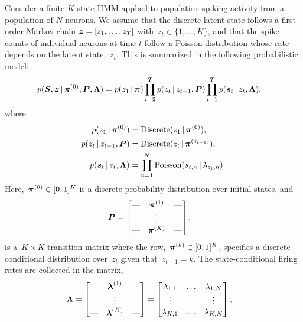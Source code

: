 Consider a finite $K$-state HMM applied to population spiking activity
from a population of $N$ neurons. We assume that the discrete latent
state follows a first-order Markov chain ${\boldsymbol{z} = \left[ z_1, \ldots,
    z_T\right]}$ with~$z_t \in \{1, \ldots, K\}$, and that the
spike counts of individual neurons at time $t$ follow a Poisson
distribution whose rate depends on the latent state,~$z_t$. This is
summarized in the following probabilistic model:
\begin{align}
  p(\boldsymbol{S}, \boldsymbol{z} \,|\, \boldsymbol{\pi}^{(0)}, \boldsymbol{P}, \boldsymbol{\Lambda}) 
  &= p(z_1\,|\, \boldsymbol{\pi}) \prod_{t=2}^T p(z_t \,|\, z_{t-1}, \boldsymbol{P}) 
  \prod_{t=1}^T p(\boldsymbol{s}_t \,|\, z_t, \boldsymbol{\Lambda}),
\end{align}
where
\begin{align*}
  p(z_1 \,|\, \boldsymbol{\pi}^{(0)}) &= \mathrm{Discrete}(z_1 \,|\, \boldsymbol{\pi}^{(0)}), \\
  p(z_t \,|\, z_{t-1}, \boldsymbol{P}) &= \mathrm{Discrete}(z_t \,|\, \boldsymbol{\pi}^{(z_{t-1})}), \\
  p(\boldsymbol{s}_t \,|\, z_t, \boldsymbol{\Lambda}) &= \prod_{n=1}^N \mathrm{Poisson}(s_{t,n} \,|\, \lambda_{z_t,n}).
\end{align*}
Here,~$\boldsymbol{\pi}^{(0)} \in [0,1]^K$ is a discrete probability distribution over
initial states, and
\begin{align*}
  \boldsymbol{P} &=
        \begin{bmatrix}
          \text{---} &  \boldsymbol{\pi}^{(1)}  & \text{---} \\
            &  \vdots &   \\
          \text{---} &  \boldsymbol{\pi}^{(K)}  & \text{---}
        \end{bmatrix},
\end{align*}
is a~${K \times K}$ transition matrix where the row,~${\boldsymbol{\pi}^{(k)} \in
  [0,1]^K}$, specifies a discrete conditional distribution over~$z_t$
given that~${z_{t-1}=k}$. 
The state-conditional firing rates are collected in the matrix,
\begin{align*}
  \boldsymbol{\Lambda} 
  &=
    \begin{bmatrix}
      \text{---} &  \boldsymbol{\lambda}^{(1)}  & \text{---} \\
      &  \vdots &   \\
      \text{---} &  \boldsymbol{\lambda}^{(K)}  & \text{---}
    \end{bmatrix}
   =
    \begin{bmatrix}
      \lambda_{1,1} & \ldots  & \lambda_{1,N}  \\
      \vdots        &         & \vdots  \\
      \lambda_{K,1} &  \ldots & \lambda_{K,N} 
    \end{bmatrix}, 
\end{align*}

